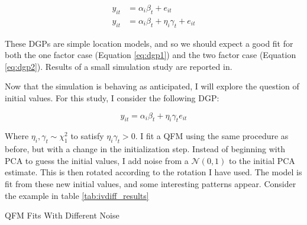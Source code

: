 \documentclass[12pt]{article}
\begin{document}
\begin{align}
    y_{it} &= \alpha_i\beta_t + e_{it} \label{eq:dgp1} \\ 
    y_{it} &= \alpha_i\beta_t + \eta_i\gamma_t + e_{it} \label{eq:dgp2}
\end{align}

\noindent These DGPs are simple location models, and so we should expect a good fit for both the one factor case (Equation \ref{eq:dgp1}) and the two factor case (Equation \ref{eq:dgp2}). Results of a small simulation study are reported in. 

\clearpage

Now that the simulation is behaving as anticipated, I will explore the question of initial values. For this study, I consider the following DGP:

\begin{equation}
    y_{it} = \alpha_i\beta_t + \eta_i\gamma_te_{it} \label{eq:dgp3}
\end{equation}

Where $\eta_i, \gamma_t \sim \chi^2_1$ to satisfy $\eta_i\gamma_t > 0$. I fit a QFM using the same procedure as before, but with a change in the initialization step. Instead of beginning with PCA to guess the initial values, I add noise from a $\mathcal{N}(0, 1)$ to the initial PCA estimate. This is then rotated according to the rotation I have used. The model is fit from these new initial values, and some interesting patterns appear. Consider the example in table \ref{tab:ivdiff_results}

\begin{table}[ht]
    \begin{center}
        \caption{QFM Fits With Different Noise}
        \label{tab:ivdiff_results}
        \scalebox{0.9}{
            
        }
    \end{center}
\end{table}



\pagebreak \newpage
\singlespacing

%

\end{document}

